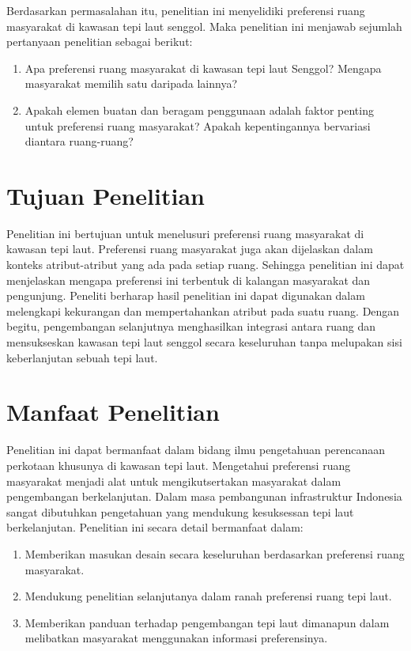 \documentclass[12pt,oneside]{udthesis}\usepackage[]{graphicx}\usepackage[]{color}
\begin{document}
Berdasarkan permasalahan itu, penelitian ini menyelidiki preferensi ruang masyarakat di kawasan tepi laut senggol. Maka penelitian ini menjawab sejumlah pertanyaan penelitian sebagai berikut:

\begin{enumerate}
\item Apa preferensi ruang masyarakat di kawasan tepi laut Senggol? Mengapa masyarakat memilih satu daripada lainnya?
    \item Apakah elemen buatan dan beragam penggunaan adalah faktor penting untuk preferensi ruang masyarakat? Apakah kepentingannya bervariasi diantara ruang-ruang?
\end{enumerate}


\section{Tujuan Penelitian}
Penelitian ini bertujuan untuk menelusuri preferensi ruang  masyarakat di kawasan tepi laut. Preferensi ruang masyarakat juga akan dijelaskan dalam konteks atribut-atribut yang ada pada setiap ruang. Sehingga penelitian ini dapat menjelaskan mengapa preferensi ini terbentuk di kalangan masyarakat dan pengunjung.
Peneliti berharap hasil penelitian ini dapat digunakan dalam melengkapi kekurangan dan mempertahankan atribut pada suatu ruang. Dengan begitu, pengembangan selanjutnya menghasilkan integrasi antara ruang dan mensukseskan kawasan tepi laut senggol secara keseluruhan tanpa melupakan sisi keberlanjutan sebuah tepi laut.

\section{Manfaat Penelitian}

Penelitian ini dapat bermanfaat dalam bidang ilmu pengetahuan perencanaan perkotaan khusunya di kawasan tepi laut. Mengetahui preferensi ruang masyarakat menjadi alat untuk mengikutsertakan masyarakat dalam pengembangan berkelanjutan. Dalam masa pembangunan infrastruktur Indonesia sangat dibutuhkan pengetahuan yang mendukung kesuksessan tepi laut berkelanjutan. Penelitian ini secara detail bermanfaat dalam:

\begin{enumerate}
\item Memberikan masukan desain secara keseluruhan berdasarkan preferensi ruang masyarakat.
\item Mendukung penelitian selanjutanya dalam ranah preferensi ruang tepi laut.
\item Memberikan panduan terhadap pengembangan tepi laut dimanapun dalam melibatkan masyarakat menggunakan informasi preferensinya.
\end{enumerate}
\end{document}
